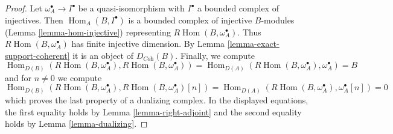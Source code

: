 \documentclass[10pt,a4paper]{amsart}
\theoremstyle{plain}
\theoremstyle{definition}
\theoremstyle{remark}
\numberwithin{equation}{subsection}
\def\Hom{\mathop{\mathrm{Hom}}\nolimits}
\begin{document}
\begin{proof}
Let $\omega_A^\bullet \to I^\bullet$ be a quasi-isomorphism
with $I^\bullet$ a bounded complex of injectives.
Then $\Hom_A(B, I^\bullet)$ is a bounded complex of injective
$B$-modules (Lemma \ref{lemma-hom-injective}) representing
$R\Hom(B, \omega_A^\bullet)$.
Thus $R\Hom(B, \omega_A^\bullet)$ has finite injective dimension.
By Lemma \ref{lemma-exact-support-coherent} it is an object of
$D_{\textit{Coh}}(B)$. Finally, we compute
$$
\Hom_{D(B)}(R\Hom(B, \omega_A^\bullet), R\Hom(B, \omega_A^\bullet)) =
\Hom_{D(A)}(R\Hom(B, \omega_A^\bullet), \omega_A^\bullet) = B
$$
and for $n \not = 0$ we compute
$$
\Hom_{D(B)}(R\Hom(B, \omega_A^\bullet), R\Hom(B, \omega_A^\bullet)[n]) =
\Hom_{D(A)}(R\Hom(B, \omega_A^\bullet), \omega_A^\bullet[n]) = 0
$$
which proves the last property of a dualizing complex.
In the displayed equations, the first
equality holds by Lemma \ref{lemma-right-adjoint}
and the second equality holds by Lemma \ref{lemma-dualizing}.
\end{proof}
\end{document}
